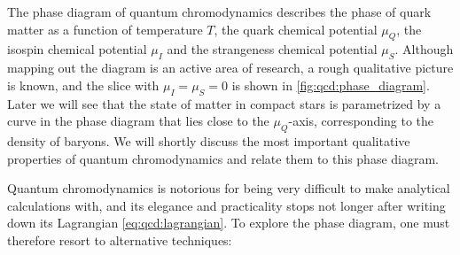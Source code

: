The phase diagram of quantum chromodynamics describes the phase of quark matter as a function of temperature $T$, the quark chemical potential $\mu_Q$, the isospin chemical potential $\mu_I$ and the strangeness chemical potential $\mu_S$.
Although mapping out the diagram is an active area of research, a rough qualitative picture is known, and the slice with $\mu_I = \mu_S = 0$ is shown in \cref{fig:qcd:phase_diagram}.
Later we will see that the state of matter in compact stars is parametrized by a curve in the phase diagram that lies close to the $\mu_Q$-axis, corresponding to the density of baryons.
We will shortly discuss the most important qualitative properties of quantum chromodynamics and relate them to this phase diagram.

Quantum chromodynamics is notorious for being very difficult to make analytical calculations with, and its elegance and practicality stops not longer after writing down its Lagrangian \eqref{eq:qcd:lagrangian}.
To explore the phase diagram, one must therefore resort to alternative techniques:
